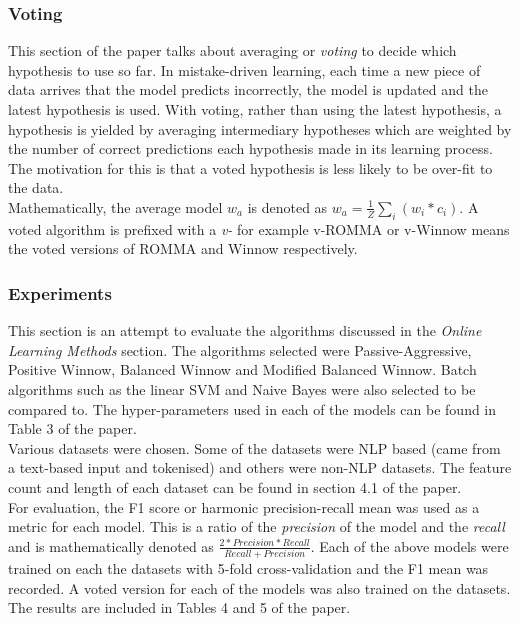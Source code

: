 \documentclass{article}
\begin{document}
\newpage
\subsubsection*{Voting}

This section of the paper talks about averaging or \emph{voting} to decide which hypothesis to use so far. 
In mistake-driven learning, each time a new piece of data arrives that the model predicts incorrectly, the model is updated and the latest
hypothesis is used. With voting, rather than using the latest hypothesis, a hypothesis is yielded by averaging intermediary 
hypotheses which are weighted by the number of correct predictions each hypothesis made in its learning process. The motivation for this is that
a voted hypothesis is less likely to be over-fit to the data.\\

Mathematically, the average model \(w_{a}\) is denoted as \(w_{a} = \frac{1}{Z}\sum_{i}(w_{i}*c_{i})\). A voted algorithm is prefixed with 
a \emph{v-} for example v-ROMMA or v-Winnow means the voted versions of ROMMA and Winnow respectively.

\subsubsection*{Experiments}

This section is an attempt to evaluate the algorithms discussed in the \emph{Online Learning Methods} section. The algorithms
selected were Passive-Aggressive, Positive Winnow, Balanced Winnow and Modified Balanced Winnow. Batch algorithms such as the linear SVM
and Naive Bayes were also selected to be compared to. The hyper-parameters used in each of the models can be found in Table 3
of the paper.\\

Various datasets were chosen. Some of the datasets were NLP based (came from a text-based input and tokenised) and others were non-NLP datasets. 
The feature count and length of each dataset can be found in section 4.1 of the paper.\\

For evaluation, the F1 score or harmonic precision-recall mean was used as a metric for each model. This is a ratio of 
the \emph{precision} of the model and the \emph{recall} and is mathematically denoted as \(\frac{2*Precision*Recall}{Recall+Precision}\). 
Each of the above models were trained on each the datasets with 5-fold cross-validation and the F1 mean was recorded. A voted version for each 
of the models was also trained on the datasets. The results are included in Tables 4 and 5 of the paper.\\
\end{document}
